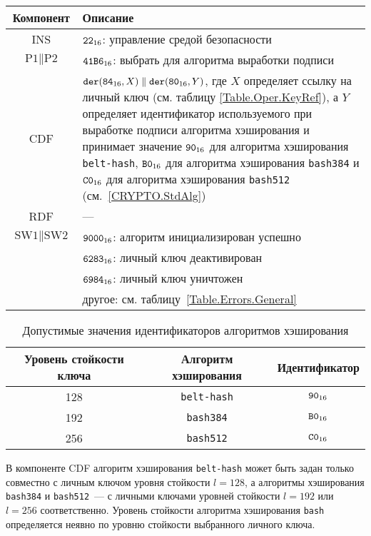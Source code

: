 \begin{table}[hbt]
\caption{}\label{Table.Oper.SetDSTCmd}
\begin{tabular}{|c|p{14cm}|}
\hline
Компонент & Описание \\
\hline
\hline
INS & $\texttt{22}_{16}$: управление средой безопасности\\ 
\hline
$\text{P1} \parallel\text{P2}$ & $\texttt{41B6}_{16}$: 
выбрать для алгоритма выработки подписи \\
\hline
CDF & 
$\texttt{der}(\texttt{84}_{16}, X) \parallel \texttt{der}(\texttt{80}_{16}, Y)$, 
где $X$ определяет ссылку на личный ключ (см. таблицу \ref{Table.Oper.KeyRef}), 
а $Y$ определяет идентификатор используемого при выработке
подписи алгоритма хэширования 
и принимает значение $\texttt{90}_{16}$ для алгоритма хэширования \texttt{belt-hash},  
$\texttt{B0}_{16}$ для алгоритма хэширования \texttt{bash384} и 
$\texttt{C0}_{16}$ для алгоритма хэширования \texttt{bash512} (см.~\ref{CRYPTO.StdAlg})\\
\hline 
RDF &  --- \\
\hline
$\text{SW1} \parallel \text{SW2}$ & 
$\texttt{9000}_{16}$: алгоритм инициализирован успешно \\
  & $\texttt{6283}_{16}$: личный ключ деактивирован \\
  & $\texttt{6984}_{16}$: личный ключ уничтожен \\
  & другое: см. таблицу~\ref{Table.Errors.General} \\
\hline
\end{tabular}
\end{table}


\begin{table}[hbt]
\caption{Допустимые значения идентификаторов алгоритмов хэширования}
\label{Table.Oper.AlgRef}
\begin{tabular}{|c|c|c|}
\hline
Уровень стойкости ключа & Алгоритм хэширования  & Идентификатор  \\
\hline
\hline
128 & \texttt{belt-hash} & $\texttt{90}_{16}$ \\
192 & \texttt{bash384} & $\texttt{B0}_{16}$ \\
256 & \texttt{bash512} & $\texttt{C0}_{16}$ \\
\hline
\end{tabular}
\end{table}

\fi


В компоненте CDF алгоритм хэширования \texttt{belt-hash}
может быть задан только совместно с личным ключом 
уровня стойкости $l=128$,
а алгоритмы хэширования \texttt{bash384} и \texttt{bash512}~--- 
с личными ключами уровней стойкости $l=192$ или $l=256$
соответственно.
Уровень стойкости алгоритма хэширования \texttt{bash} определяется 
неявно по уровню стойкости выбранного личного ключа.

